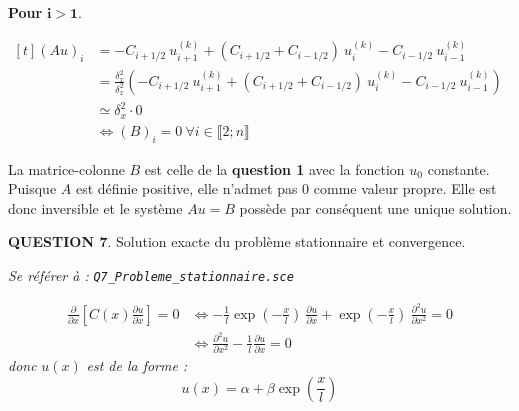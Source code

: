 \documentclass[a4paper,11pt]{article}
\newcommand{\quest}[1]{\small\textbf{#1}\normalsize}
\theoremstyle{nonumberplain}
\theoremstyle{nonumberplain}
\theoremstyle{nonumberplain}
\begin{document}
    \smallskip
    \textbf{Pour }$\mathbf{i > 1}$.
    \begin{calculs}
        $\begin{aligned}[t]
            (Au)_{i} & = -C_{i+1/2}\ u_{i+1}^{(k)} + (C_{i+1/2} + C_{i-1/2})\ u_i^{(k)} - C_{i-1/2}\ u_{i-1}^{(k)} \\
                     & = \frac{\delta_{x}^2}{\delta_{x}^2} (-C_{i+1/2}\ u_{i+1}^{(k)} + (C_{i+1/2} + C_{i-1/2})\ u_i^{(k)} - C_{i-1/2}\ u_{i-1}^{(k)}) \\
                     & \simeq \delta_{x}^2 \cdot 0 \\
                     &\iff (B)_{i} = 0\ \forall i \in \llbracket 2; n \rrbracket
        \end{aligned}$
    \end{calculs}

    La matrice-colonne $B$ est celle de la \quest{question 1} avec la fonction $u_0$ constante.\newline\newline
    Puisque $A$ est définie positive, elle n'admet pas $0$ comme valeur propre.\newline
    Elle est donc inversible et le système $A u = B$ possède par conséquent une unique solution.\newline

    \bigskip
    \quest{QUESTION 7}. Solution exacte du problème stationnaire et convergence.
    \begin{ref_scilab}
        \emph{Se référer à :} \texttt{\emph{Q7\_Probleme\_stationnaire.sce}}
    \end{ref_scilab}

    \vspace{-2ex}

    \begin{calculs}
        \vspace{-2ex}
        \begin{equation*}
        \begin{split}
            \frac{\partial}{\partial x}[C(x)\frac{\partial u}{\partial x}] = 0 & \iff
            -\frac{1}{l} \exp(-\frac{x}{l})\ \frac{\partial u}{\partial x} + \exp(-\frac{x}{l})\ \frac{\partial^2 u }{\partial x^2} = 0 \\
            & \iff \frac{\partial^2 u}{\partial x^2} - \frac{1}{l} \frac{\partial u}{\partial x} = 0
        \end{split}
        \end{equation*}
        \emph{donc }$u(x)$\emph{ est de la forme :}
        $$ u(x) = \alpha + \beta \exp(\frac{x}{l}) $$
    \end{calculs}
\end{document}
